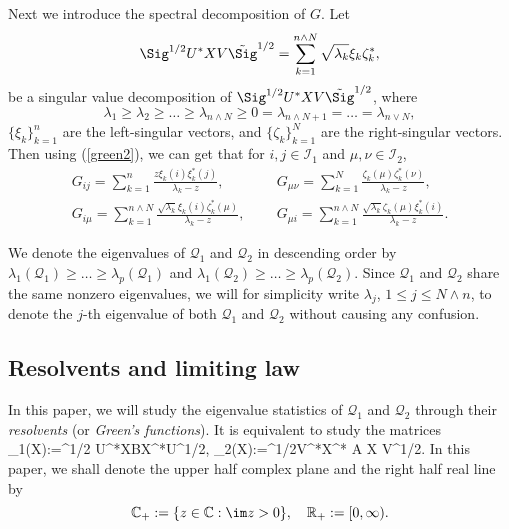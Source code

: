  
Next we introduce the spectral decomposition of $G$. Let
$$\Sig^{1/2} U^{*}X V\tilde \Sig^{1/2}  = \sum_{k = 1}^{n\wedge N} {\sqrt {\lambda_k} \xi_k } \zeta _{k}^* ,$$
be a singular value decomposition of $\Sig^{1/2} U^{*}X V\tilde \Sig^{1/2}$, where
$$\lambda_1\ge \lambda_2 \ge \ldots \ge \lambda_{n\wedge N} \ge 0 = \lambda_{n\wedge N+1} = \ldots = \lambda_{n\vee N},$$
$\{\xi_{k}\}_{k=1}^{n}$ are the left-singular vectors, and $\{\zeta_{k}\}_{k=1}^{N}$ are the right-singular vectors.
Then using (\ref{green2}), we can get that for $i,j\in \mathcal I_1$ and $\mu,\nu\in \mathcal I_2$,
\begin{align}
G_{ij} = \sum_{k = 1}^{n} \frac{z\xi_k(i) \xi_k^*(j)}{\lambda_k-z},\ \quad \ &G_{\mu\nu} = \sum_{k = 1}^{N} \frac{\zeta_k(\mu) \zeta_k^*(\nu)}{\lambda_k-z}, \label{spectral1}\\
G_{i\mu} = \sum_{k = 1}^{n\wedge N} \frac{\sqrt{\lambda_k}\xi_k(i) \zeta_k^*(\mu)}{\lambda_k-z}, \ \quad \ &G_{\mu i} = \sum_{k = 1}^{n\wedge N} \frac{\sqrt{\lambda_k}\zeta_k(\mu) \xi_k^*(i)}{\lambda_k-z}.\label{spectral2}
\end{align}

We denote the eigenvalues of $\mathcal Q_1$ and $\mathcal Q_2$ in descending order by $\lambda_1(\mathcal Q_1)\geq \ldots \geq \lambda_{p}(\mathcal Q_1)$ and $\lambda_1(\mathcal Q_2) \geq \ldots \geq \lambda_p(\mathcal Q_2)$. Since $\mathcal Q_1$ and $\mathcal Q_2$ share the same nonzero eigenvalues, we will for simplicity write $\lambda_j$, $1\le j \le N\wedge n$, to denote the $j$-th eigenvalue of both $\mathcal Q_1$ and $\mathcal Q_2$ without causing any confusion. 


\cob 

\subsection{Resolvents and limiting law}

In this paper, we will study the eigenvalue statistics of $\mathcal Q_{1}$ and $\mathcal Q_2$ through their {\it{resolvents}} (or  {\it{Green's functions}}). It is equivalent to study the matrices 
\be\label{Qtilde}
_1(X):=\Sig^{1/2} U^{*}XBX^*U\Sig^{1/2}, \quad {}_2(X):=\wt\Sig^{1/2}V^*X^* A X V\wt \Sig^{1/2}.
\ee
In this paper, we shall denote the upper half complex plane and the right half real line by 
$$\mathbb C_+:=\{z\in \mathbb C: \im z>0\}, \quad \mathbb R_+:=[0,\infty).$$ %

